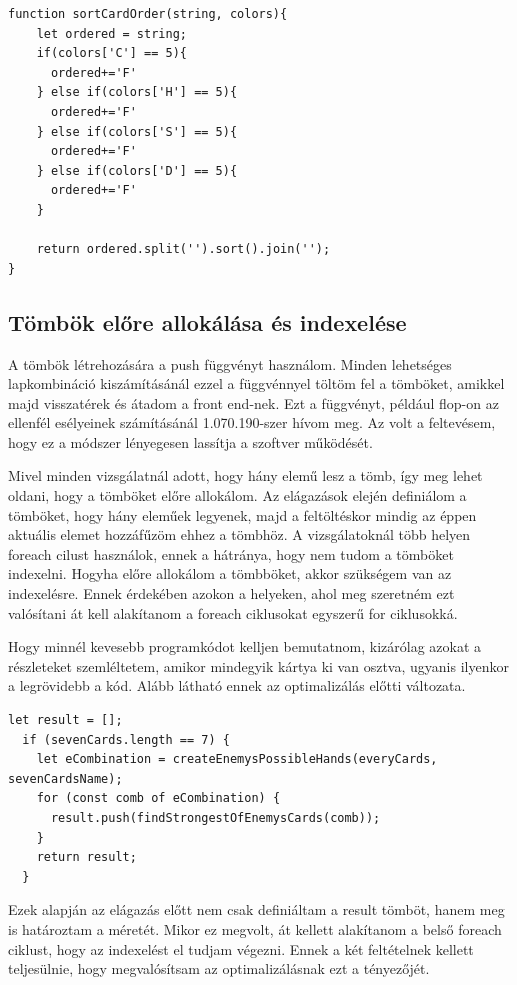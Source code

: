 \begin{lstlisting}[style=htmlcssjs]
function sortCardOrder(string, colors){
    let ordered = string;
    if(colors['C'] == 5){
      ordered+='F'
    } else if(colors['H'] == 5){
      ordered+='F'
    } else if(colors['S'] == 5){
      ordered+='F'
    } else if(colors['D'] == 5){
      ordered+='F'
    }
  
    return ordered.split('').sort().join('');
}
\end{lstlisting}

\subsection{Tömbök előre allokálása és indexelése}
A tömbök létrehozására a push függvényt használom. Minden lehetséges lapkombináció kiszámításánál ezzel a függvénnyel töltöm fel a tömböket, amikkel majd visszatérek és átadom a front end-nek. Ezt a függvényt, például flop-on az ellenfél esélyeinek számításánál 1.070.190-szer hívom meg. Az volt a feltevésem, hogy ez a módszer lényegesen lassítja a szoftver működését.

Mivel minden vizsgálatnál adott, hogy hány elemű lesz a tömb, így meg lehet oldani, hogy a tömböket előre allokálom. Az elágazások elején definiálom a tömböket, hogy hány eleműek legyenek, majd a feltöltéskor mindig az éppen aktuális elemet hozzáfűzöm ehhez a tömbhöz. A vizsgálatoknál több helyen foreach cilust használok, ennek a hátránya, hogy nem tudom a tömböket indexelni. Hogyha előre allokálom a tömbböket, akkor szükségem van az indexelésre. Ennek érdekében azokon a helyeken, ahol meg szeretném ezt valósítani át kell alakítanom a foreach ciklusokat egyszerű for ciklusokká.

Hogy minnél kevesebb programkódot kelljen bemutatnom, kizárólag azokat a részleteket szemléltetem, amikor mindegyik kártya ki van osztva, ugyanis ilyenkor a legrövidebb a kód. Alább látható ennek az optimalizálás előtti változata.

\begin{lstlisting}[style=htmlcssjs]
  let result = [];
  if (sevenCards.length == 7) {
    let eCombination = createEnemysPossibleHands(everyCards, sevenCardsName);
    for (const comb of eCombination) {
      result.push(findStrongestOfEnemysCards(comb));
    }
    return result;
  }
\end{lstlisting}

Ezek alapján az elágazás előtt nem csak definiáltam a result tömböt, hanem meg is határoztam a méretét. Mikor ez megvolt, át kellett alakítanom a belső foreach ciklust, hogy az indexelést el tudjam végezni. Ennek a két feltételnek kellett teljesülnie, hogy megvalósítsam az optimalizálásnak ezt a tényezőjét.

